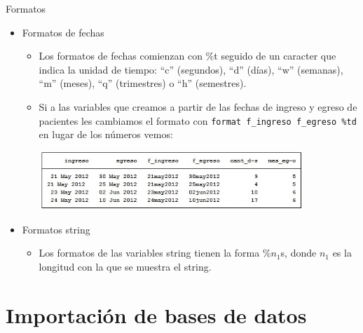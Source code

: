 \documentclass{beamer}
\begin{document}
\begin{frame}[allowframebreaks]{Formatos}
\begin{itemize}
\item  Formatos de fechas
\begin{itemize}
\item Los formatos de fechas comienzan con \%t seguido de un caracter que indica la unidad de tiempo: ``c'' (segundos), ``d'' (días), ``w'' (semanas), ``m'' (meses), ``q'' (trimestres) o ``h'' (semestres).
\item Si a las variables que creamos a partir de las fechas de ingreso y egreso de pacientes les cambiamos el formato con \texttt{format  f\_ingreso f\_egreso \%td} en lugar de los números vemos:\\\medskip
\centerline{\includegraphics[height=2.2cm]{format2.jpg}}
\end{itemize}
\item Formatos string
\begin{itemize}
\item Los formatos de las variables string tienen la forma \%$n_{1}$s, donde $n_{1}$ es la longitud con la que se muestra el string.
\end{itemize}
\end{itemize}
\end{frame}

\section{Importación de bases de datos}
\end{document}
